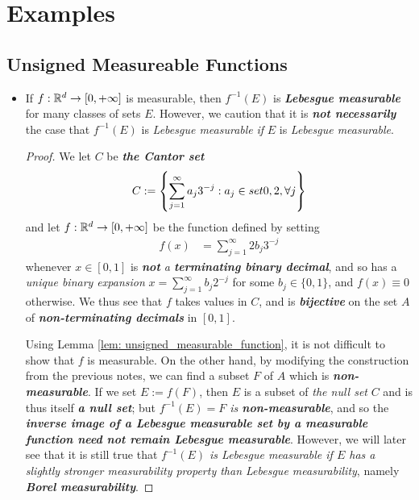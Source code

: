 \documentclass[11pt]{article}
\begin{document}
\newpage
\section{Examples}
\subsection{Unsigned Measureable Functions}
\begin{itemize}
\item \begin{example}
If $f : {\mathbb R}^d \rightarrow [0, +\infty]$ is measurable, then $f^{-1}(E)$ is \emph{\textbf{Lebesgue measurable}} for many classes of sets $E$. However, we caution that it is \emph{\textbf{not necessarily}} the case that $f^{-1}(E)$ is \emph{Lebesgue measurable} \emph{if} $E$ is \emph{Lebesgue measurable}. 
\end{example}
\begin{proof}
We let $C$ be \emph{\textbf{the Cantor set}}
\begin{align*}
C:= \left\{\sum_{j=1}^{\infty}a_j 3^{-j}: a_j \in set{0, 2}, \forall j\right\}
\end{align*}
and let $f : {\mathbb R}^d \rightarrow [0, +\infty]$ be the function defined by setting
\begin{align*}
f(x) &= \sum_{j=1}^{\infty}2 b_j 3^{-j}
\end{align*}
whenever $ x \in [0, 1]$ is \emph{\textbf{not} a \textbf{terminating binary decimal}}, and so has a \emph{unique binary expansion} $x = \sum_{j=1}^{\infty} b_j 2^{-j}$ for some $b_j \in \{0, 1\}$, and $f(x) \equiv 0$ otherwise. We thus see that $f$ takes values in $C$, and is \emph{\textbf{bijective}} on the set $A$ of \emph{\textbf{non-terminating decimals}} in $[0, 1]$. 

Using Lemma \ref{lem: unsigned_measurable_function}, it is not difficult to show that $f$ is measurable. On the other hand, by modifying the construction from the previous notes, we can find a subset $F$ of $A$ which is \emph{\textbf{non-measurable}}. If we set $E := f(F)$, then $E$ is a subset of \emph{the null set} $C$ and is thus itself
\emph{\textbf{a null set}}; but \emph{$f^{-1}(E) = F$ is \textbf{non-measurable}}, and so the \emph{\textbf{inverse image of a Lebesgue measurable set by a measurable function need not remain Lebesgue measurable}}. However, we will later see that it is still true that \emph{$f^{-1}(E)$ is Lebesgue measurable if $E$ has a slightly stronger measurability property than Lebesgue measurability}, namely \emph{\textbf{Borel measurability}}.
\end{proof}
\end{itemize}

\newpage


\end{document}
